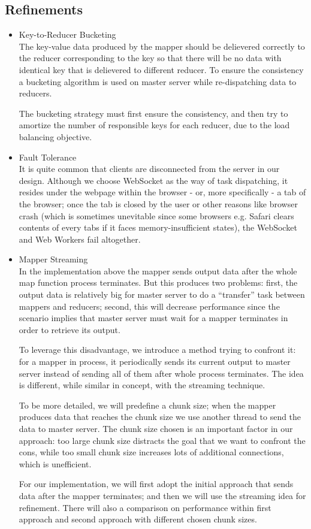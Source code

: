 \subsection{Refinements}

\begin{itemize}

\item Key-to-Reducer Bucketing\\
The key-value data produced by the mapper should be delievered correctly to the reducer corresponding to the key so that there will be no data with identical key that is delievered to different reducer. To ensure the consistency a bucketing algorithm is used on master server while re-dispatching data to reducers.

The bucketing strategy must first ensure the consistency, and then try to amortize the number of responsible keys for each reducer, due to the load balancing objective.

\item Fault Tolerance\\
It is quite common that clients are disconnected from the server in our design. Although we choose WebSocket as the way of task dispatching, it resides under the webpage within the browser - or, more specifically - a tab of the browser; once the tab is closed by the user or other reasons like browser crash (which is sometimes unevitable since some browsers e.g. Safari clears contents of every tabs if it faces memory-insufficient states), the WebSocket and Web Workers fail altogether.

\item Mapper Streaming\\
In the implementation above the mapper sends output data after the whole map function process terminates. But this produces two problems: first, the output data is relatively big for master server to do a “transfer” task between mappers and reducers; second, this will decrease performance since the scenario implies that master server must wait for a mapper terminates in order to retrieve its output.

To leverage this disadvantage, we introduce a method trying to confront it: for a mapper in process, it periodically sends its current output to master server instead of sending all of them after whole process terminates. The idea is different, while similar in concept, with the streaming technique.

To be more detailed, we will predefine a chunk size; when the mapper produces data that reaches the chunk size we use another thread to send the data to master server. The chunk size chosen is an important factor in our approach: too large chunk size distracts the goal that we want to confront the cons, while too small chunk size increases lots of additional connections, which is unefficient.

For our implementation, we will first adopt the initial approach that sends data after the mapper terminates; and then we will use the streaming idea for refinement. There will also a comparison on performance within first approach and second approach with different chosen chunk sizes.

\end{itemize}